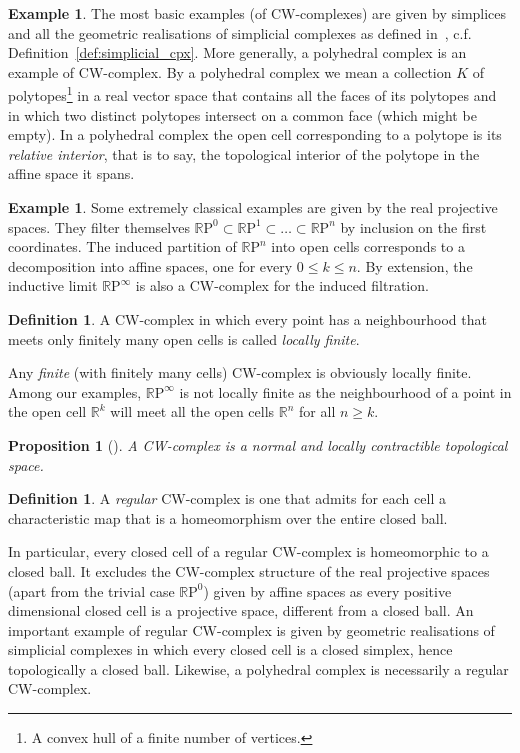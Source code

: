 \documentclass[10pt]{amsart}
\newtheorem{prop}[theo]{Proposition}
\theoremstyle{definition}
\newtheorem{defi}[theo]{Definition}
\newtheorem{exam}[theo]{Example}
\numberwithin{equation}{section}
\numberwithin{figure}{section}
\newcommand{\R}{\mathbb{R}}
\renewcommand{\P}{\mathrm{P}}
\begin{document}
\begin{exam}
The most basic examples (of CW-complexes) are given by simplices and all the geometric realisations of simplicial complexes as defined in~\cite{Whi_sim_spa}, c.f. Definition~\ref{def:simplicial_cpx}. More generally, a polyhedral complex is an example of CW-complex. By a polyhedral complex we mean a collection $K$ of polytopes\footnote{A convex hull of a finite number of vertices.} in a real vector space that contains all the faces of its polytopes and in which two distinct polytopes intersect on a common face (which might be empty). In a polyhedral complex the open cell corresponding to a polytope is its \emph{relative interior}, that is to say, the topological interior of the polytope in the affine space it spans.
\end{exam}
\begin{exam}
Some extremely classical examples are given by the real projective spaces. They filter themselves ${\R \P^0\subset\R \P^1\subset\dots \subset \R \P^n}$ by inclusion on the first coordinates. The induced partition of $\R \P^n$ into open cells corresponds to a decomposition into affine spaces, one for every $0\leq k\leq n$. By extension, the inductive limit $\R \P^\infty$ is also a CW-complex for the induced filtration.
\end{exam}

\begin{defi}
A CW-complex in which every point has a neighbourhood that meets only finitely many open cells is called \emph{locally finite}.
\end{defi}

Any \emph{finite} (with finitely many cells) CW-complex is obviously locally finite. Among our examples, $\R \P^\infty$ is not locally finite as the neighbourhood of a point in the open cell $\R^k$ will meet all the open cells $\R^n$ for all $n\geq k$.

\begin{prop}[{\cite[(G), pp.~225-227, (M), pp.~230-231]{Whi_com_hom}}]
A CW-complex is a normal and locally contractible topological space.
\end{prop}

\begin{defi}
A \emph{regular} CW-complex is one that admits for each cell a characteristic map that is a homeomorphism over the entire closed ball.
\end{defi}

In particular, every closed cell of a regular CW-complex is homeomorphic to a closed ball. It excludes the CW-complex structure of the real projective spaces (apart from the trivial case $\R \P^0$) given by affine spaces as every positive dimensional closed cell is a projective space, different from a closed ball. An important example of regular CW-complex is given by geometric realisations of simplicial complexes in which every closed cell is a closed simplex, hence topologically a closed ball. Likewise, a polyhedral complex is necessarily a regular CW-complex.
\end{document}
